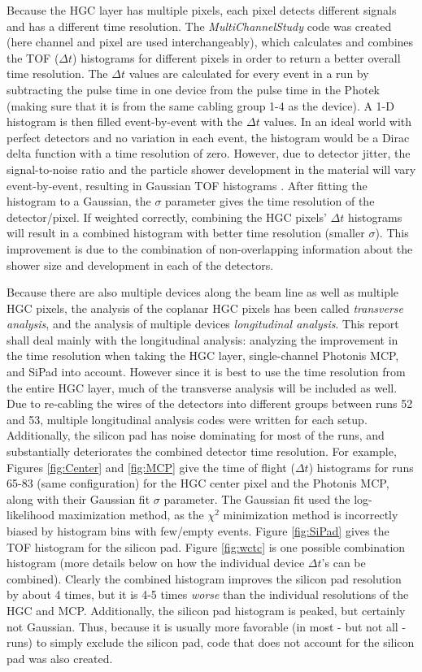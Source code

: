 \documentclass[12pt]{article}
\begin{document}
Because the HGC layer has multiple pixels, each pixel detects different signals and has a different time resolution. 
The \textit{MultiChannelStudy} code was created (here channel and pixel are used interchangeably), which calculates and combines the TOF ($\Delta t$) histograms for different pixels in order to return a better overall time resolution. 
The $\Delta t$ values are calculated for every event in a run by subtracting the pulse time in one device from the pulse time in the Photek (making sure that it is from the same cabling group 1-4 as the device). 
A 1-D histogram is then filled event-by-event with the $\Delta t$ values. 
In an ideal world with perfect detectors and no variation in each event, the histogram would be a Dirac delta function with a time resolution of zero. 
However, due to detector jitter, the signal-to-noise ratio and the particle shower development in the material will vary event-by-event, resulting in Gaussian TOF histograms \cite{P2}. 
After fitting the histogram to a Gaussian, the $\sigma$ parameter gives the time resolution of the detector/pixel. 
If weighted correctly, combining the HGC pixels’ $\Delta t$ histograms will result in a combined histogram with better time resolution (smaller $\sigma$). 
This improvement is due to the combination of non-overlapping information about the shower size and development in each of the detectors.

Because there are also multiple devices along the beam line as well as multiple HGC pixels, the analysis of the coplanar HGC pixels has been called \textit{transverse analysis}, and the analysis of multiple devices \textit{longitudinal analysis}. 
This report shall deal mainly with the longitudinal analysis: analyzing the improvement in the time resolution when taking the HGC layer, single-channel Photonis MCP, and SiPad into account. 
However since it is best to use the time resolution from the entire HGC layer, much of the transverse analysis will be included as well. 
Due to re-cabling the wires of the detectors into different groups between runs 52 and 53, multiple longitudinal analysis codes were written for each setup. 
Additionally, the silicon pad has noise dominating for most of the runs, and substantially deteriorates the combined detector time resolution. 
For example, Figures \ref{fig:Center} and \ref{fig:MCP} give the time of flight ($\Delta t$) histograms for runs 65-83 (same configuration) for the HGC center pixel and the Photonis MCP, along with their Gaussian fit $\sigma$ parameter. 
The Gaussian fit used the log-likelihood maximization method, as the $\chi^2$ minimization method is incorrectly biased by histogram bins with few/empty events.
Figure \ref{fig:SiPad} gives the TOF histogram for the silicon pad. 
Figure \ref{fig:wctc} is one possible combination histogram (more details below on how the individual device $\Delta t$'s can be combined). 
Clearly the combined histogram improves the silicon pad resolution by about 4 times, but it is 4-5 times \textit{worse} than the individual resolutions of the HGC and MCP. 
Additionally, the silicon pad histogram is peaked, but certainly not Gaussian. 
Thus, because it is usually more favorable (in most - but not all - runs) to simply exclude the silicon pad, code that does not account for the silicon pad was also created.
\end{document}

